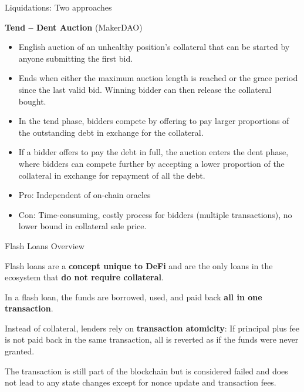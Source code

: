 \documentclass[handout]{beamer}
\begin{document}
\begin{frame}{Liquidations: Two approaches }

\vspace{1em}

\textbf{Tend – Dent Auction} (MakerDAO)

\begin{itemize}
\item English auction of an unhealthy position’s collateral that can be started by anyone submitting the first bid.
\item Ends when either the maximum auction length is reached or the grace period since the last valid bid. Winning bidder can then release the collateral bought.


\item In the tend phase, bidders compete by offering to pay larger proportions of the outstanding debt in exchange for the collateral.
\item If a bidder offers to pay the debt in full, the auction enters the dent phase, where bidders can compete further by accepting a lower proportion of the collateral in exchange for repayment of all the debt.

\item Pro: Independent of on-chain oracles

\item Con: Time-consuming, costly process for bidders (multiple transactions), no lower bound in collateral sale price.
\end{itemize}

	
\end{frame}


\begin{frame}{Flash Loans Overview}

Flash loans are a \textbf{concept unique to DeFi} and are the only loans in the ecosystem that \textbf{do not require collateral}.

\vspace{1em}

In a flash loan, the funds are borrowed, used, and paid back \textbf{all in one transaction}.

\vspace{1em}

Instead of collateral, lenders rely on \textbf{transaction atomicity}: If principal plus fee is not paid back in the same transaction, all is reverted as if the funds were never granted.

\vspace{1em}

The transaction is still part of the blockchain but is considered failed and does not lead to any state changes except for nonce update and transaction fees. 



	
\end{frame}
\end{document}
